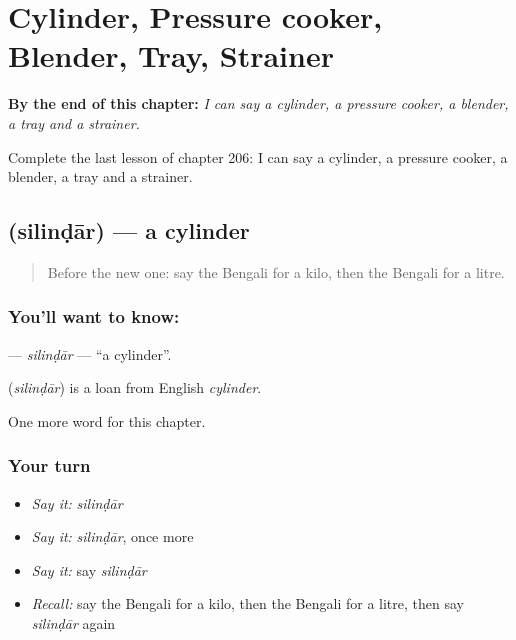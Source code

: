 
\chapter{Cylinder, Pressure cooker, Blender, Tray, Strainer}
\label{ch:bn-cylinder-pressure-cooker-blender-tray-strainer}

\begin{chapteropening}
\textbf{By the end of this chapter:} \emph{I can say a cylinder, a pressure cooker, a blender, a tray and a strainer.}

Complete the last lesson of chapter 206: I can say a cylinder, a pressure cooker, a blender, a tray and a strainer.
\end{chapteropening}

\section[\texorpdfstring{\bn{সিলিন্ডার} (silinḍār)}{সিলিন্ডার (silinḍār)}]{ (silinḍār) — a cylinder}

\label{lesson:BN-C206-silindar}



\begin{quote}
Before the new one: say the Bengali for a kilo, then the Bengali for a litre.
\end{quote}

\subsection*{You'll want to know: }
\textbf{} — \emph{silinḍār} — \textquotedblleft{}a cylinder\textquotedblright{}.

\begin{cousinweb}
\textbf{} (\emph{silinḍār}) is a loan from English \emph{cylinder}.
\end{cousinweb}

\begin{grammarlens}[title={What you've built}]
One more word for this chapter.
\end{grammarlens}

\subsection*{Your turn}
\begin{itemize}
\raggedright
  \item \emph{Say it:} \emph{silinḍār}
  \item \emph{Say it:} \emph{silinḍār}, once more
  \item \emph{Say it:} say \emph{silinḍār}
  \item \emph{Recall:} say the Bengali for a kilo, then the Bengali for a litre, then say \emph{silinḍār} again
\end{itemize}

